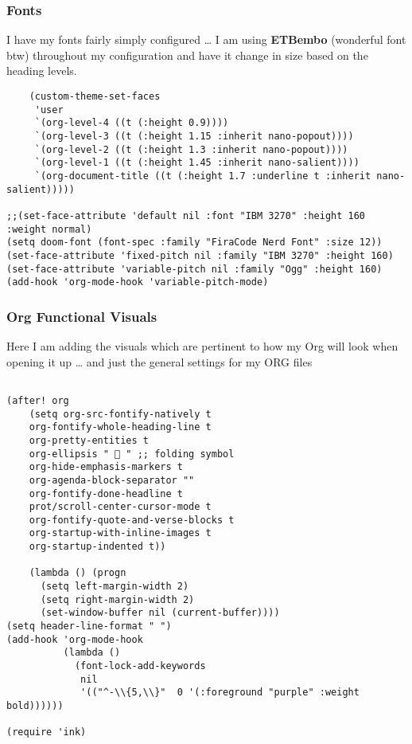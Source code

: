 \documentclass[11pt]{article}
\begin{document}
\subsubsection{Fonts}
\label{sec:org2ad246e}
I have my fonts fairly simply configured \ldots{} I am using \textbf{ETBembo} (wonderful font btw) throughout my configuration and have it change in size based on the heading levels.
\begin{verbatim}
    (custom-theme-set-faces
     'user
     `(org-level-4 ((t (:height 0.9))))
     `(org-level-3 ((t (:height 1.15 :inherit nano-popout))))
     `(org-level-2 ((t (:height 1.3 :inherit nano-popout))))
     `(org-level-1 ((t (:height 1.45 :inherit nano-salient))))
     `(org-document-title ((t (:height 1.7 :underline t :inherit nano-salient)))))

;;(set-face-attribute 'default nil :font "IBM 3270" :height 160 :weight normal)
(setq doom-font (font-spec :family "FiraCode Nerd Font" :size 12))
(set-face-attribute 'fixed-pitch nil :family "IBM 3270" :height 160)
(set-face-attribute 'variable-pitch nil :family "Ogg" :height 160)
(add-hook 'org-mode-hook 'variable-pitch-mode)
\end{verbatim}

\subsubsection{Org Functional Visuals}
\label{sec:org98fa2e6}
Here I am adding the visuals which are pertinent to how my Org will look when opening it up \ldots{} and just the general settings for my ORG files
\begin{verbatim}

(after! org
    (setq org-src-fontify-natively t
    org-fontify-whole-heading-line t
    org-pretty-entities t
    org-ellipsis "  " ;; folding symbol
    org-hide-emphasis-markers t
    org-agenda-block-separator ""
    org-fontify-done-headline t
    prot/scroll-center-cursor-mode t
    org-fontify-quote-and-verse-blocks t
    org-startup-with-inline-images t
    org-startup-indented t))

    (lambda () (progn
      (setq left-margin-width 2)
      (setq right-margin-width 2)
      (set-window-buffer nil (current-buffer))))
(setq header-line-format " ")
(add-hook 'org-mode-hook
          (lambda ()
            (font-lock-add-keywords
             nil
             '(("^-\\{5,\\}"  0 '(:foreground "purple" :weight bold))))))

(require 'ink)
\end{verbatim}
\end{document}
